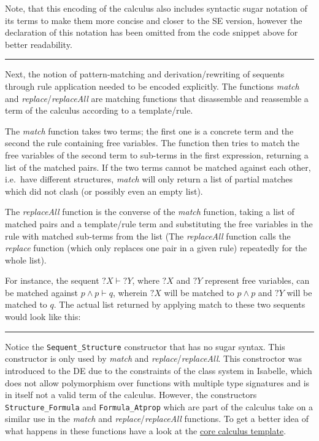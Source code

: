 Note, that this encoding of the calculus also includes syntactic sugar
notation of its terms to make them more concise and closer to the SE
version, however the declaration of this notation has been omitted from
the code snippet above for better readability.

\begin{center}\rule{3in}{0.4pt}\end{center}

Next, the notion of pattern-matching and derivation/rewriting of
sequents through rule application needed to be encoded explicitly. The
functions \emph{match} and \emph{replace}/\emph{replaceAll} are matching
functions that disassemble and reassemble a term of the calculus
according to a template/rule.

The \emph{match} function takes two terms; the first one is a concrete
term and the second the rule containing free variables. The function
then tries to match the free variables of the second term to sub-terms
in the first expression, returning a list of the matched pairs. If the
two terms cannot be matched against each other, i.e.~have different
structures, \emph{match} will only return a list of partial matches
which did not clash (or possibly even an empty list).

The \emph{replaceAll} function is the converse of the \emph{match}
function, taking a list of matched pairs and a template/rule term and
substituting the free variables in the rule with matched sub-terms from
the list (The \emph{replaceAll} function calls the \emph{replace}
function (which only replaces one pair in a given rule) repeatedly for
the whole list).

For instance, the sequent $?X \vdash ?Y$, where $?X$ and $?Y$ represent
free variables, can be matched against $p \land p \vdash q$, wherein
$?X$ will be matched to $p \land p$ and $?Y$ will be matched to $q$. The
actual list returned by applying match to these two sequents would look
like this:

\begin{center}\rule{3in}{0.4pt}\end{center}

Notice the \texttt{Sequent\_Structure} constructor that has no sugar
syntax. This constructor is only used by \emph{match} and
\emph{replace}/\emph{replaceAll}. This constroctor was introduced to the
DE due to the constraints of the class system in Isabelle, which does
not allow polymorphism over functions with multiple type signatures and
is in itself not a valid term of the calculus. However, the constructors
\texttt{Structure\_Formula} and \texttt{Formula\_Atprop} which are part
of the calculus take on a similar use in the \emph{match} and
\emph{replace}/\emph{replaceAll} functions. To get a better idea of what
happens in these functions have a look at the
\href{https://github.com/goodlyrottenapple/calculus-toolbox/blob/master/template/Calc_Core.thy}{core
calculus template}.

